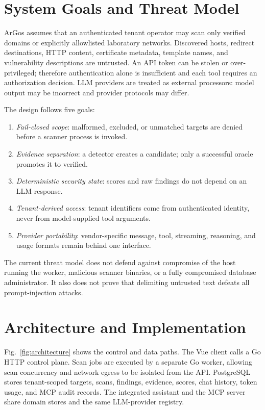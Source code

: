 \documentclass[conference,a4paper]{IEEEtran}
\newcommand{\argos}{ArGos\xspace}
\begin{document}
\section{System Goals and Threat Model}

\argos assumes that an authenticated tenant operator may scan only verified domains or explicitly allowlisted laboratory networks. Discovered hosts, redirect destinations, HTTP content, certificate metadata, template names, and vulnerability descriptions are untrusted. An API token can be stolen or over-privileged; therefore authentication alone is insufficient and each tool requires an authorization decision. LLM providers are treated as external processors: model output may be incorrect and provider protocols may differ.

The design follows five goals:
\begin{enumerate}
    \item \textit{Fail-closed scope}: malformed, excluded, or unmatched targets are denied before a scanner process is invoked.
    \item \textit{Evidence separation}: a detector creates a candidate; only a successful oracle promotes it to verified.
    \item \textit{Deterministic security state}: scores and raw findings do not depend on an LLM response.
    \item \textit{Tenant-derived access}: tenant identifiers come from authenticated identity, never from model-supplied tool arguments.
    \item \textit{Provider portability}: vendor-specific message, tool, streaming, reasoning, and usage formats remain behind one interface.
\end{enumerate}

The current threat model does not defend against compromise of the host running the worker, malicious scanner binaries, or a fully compromised database administrator. It also does not prove that delimiting untrusted text defeats all prompt-injection attacks.

\section{Architecture and Implementation}

Fig.~\ref{fig:architecture} shows the control and data paths. The Vue client calls a Go HTTP control plane. Scan jobs are executed by a separate Go worker, allowing scan concurrency and network egress to be isolated from the API. PostgreSQL stores tenant-scoped targets, scans, findings, evidence, scores, chat history, token usage, and MCP audit records. The integrated assistant and the MCP server share domain stores and the same LLM-provider registry.
\end{document}
